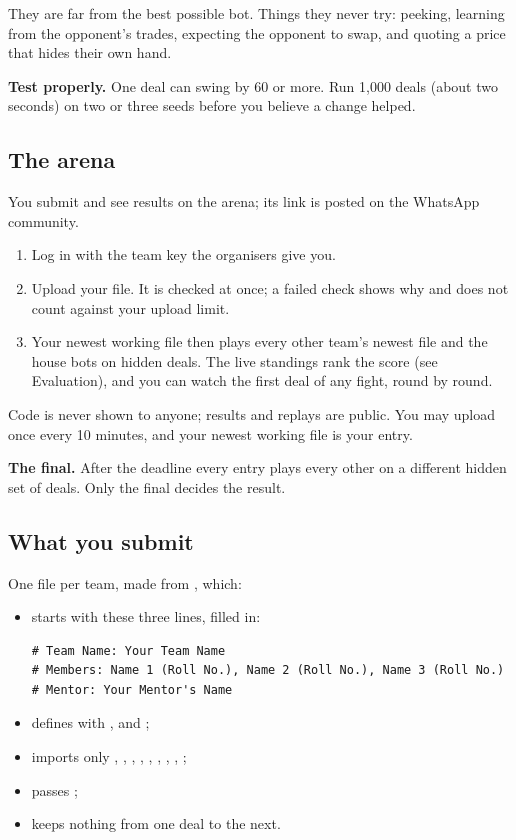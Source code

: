 They are far from the best possible bot. Things they never try: peeking, learning from the
opponent's trades, expecting the opponent to swap, and quoting a price that hides their own
hand.

\textbf{Test properly.} One deal can swing by 60 or more. Run 1,000 deals (about two seconds)
on two or three seeds before you believe a change helped.

\subsection{The arena}

You submit and see results on the arena; its link is posted on the WhatsApp community.

\begin{enumerate}
  \item Log in with the team key the organisers give you.
  \item Upload your  file. It is checked at once; a failed check shows why and does
        not count against your upload limit.
  \item Your newest working file then plays every other team's newest file and the house bots
        on hidden deals. The live standings rank the score (see Evaluation), and you can watch the first
        deal of any fight, round by round.
\end{enumerate}

Code is never shown to anyone; results and replays are public. You may upload once every 10
minutes, and your newest working file is your entry.

\textbf{The final.} After the deadline every entry plays every other on a different hidden set
of deals. Only the final decides the result.

\subsection{What you submit}

One  file per team, made from , which:

\begin{itemize}
  \item starts with these three lines, filled in:
\begin{lstlisting}
# Team Name: Your Team Name
# Members: Name 1 (Roll No.), Name 2 (Roll No.), Name 3 (Roll No.)
# Mentor: Your Mentor's Name
\end{lstlisting}
  \item defines  with ,  and ;
  \item imports only , , , ,
        , , , , ;
  \item passes ;
  \item keeps nothing from one deal to the next.
\end{itemize}

